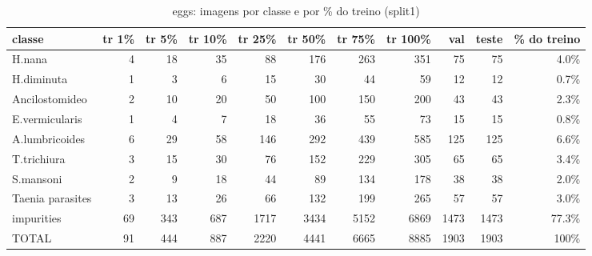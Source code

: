 \begin{table}[h]\centering\small
\caption{eggs: imagens por classe e por \% do treino (split1)}
\begin{tabular}{lrrrrrrrrrr}\toprule
classe & tr 1\% & tr 5\% & tr 10\% & tr 25\% & tr 50\% & tr 75\% & tr 100\% & val & teste & \% do treino \\\midrule
H.nana & 4 & 18 & 35 & 88 & 176 & 263 & 351 & 75 & 75 & 4.0\% \\
H.diminuta & 1 & 3 & 6 & 15 & 30 & 44 & 59 & 12 & 12 & 0.7\% \\
Ancilostomideo & 2 & 10 & 20 & 50 & 100 & 150 & 200 & 43 & 43 & 2.3\% \\
E.vermicularis & 1 & 4 & 7 & 18 & 36 & 55 & 73 & 15 & 15 & 0.8\% \\
A.lumbricoides & 6 & 29 & 58 & 146 & 292 & 439 & 585 & 125 & 125 & 6.6\% \\
T.trichiura & 3 & 15 & 30 & 76 & 152 & 229 & 305 & 65 & 65 & 3.4\% \\
S.mansoni & 2 & 9 & 18 & 44 & 89 & 134 & 178 & 38 & 38 & 2.0\% \\
Taenia parasites & 3 & 13 & 26 & 66 & 132 & 199 & 265 & 57 & 57 & 3.0\% \\
impurities & 69 & 343 & 687 & 1717 & 3434 & 5152 & 6869 & 1473 & 1473 & 77.3\% \\
\midrule TOTAL & 91 & 444 & 887 & 2220 & 4441 & 6665 & 8885 & 1903 & 1903 & 100\% \\\bottomrule
\end{tabular}\end{table}
